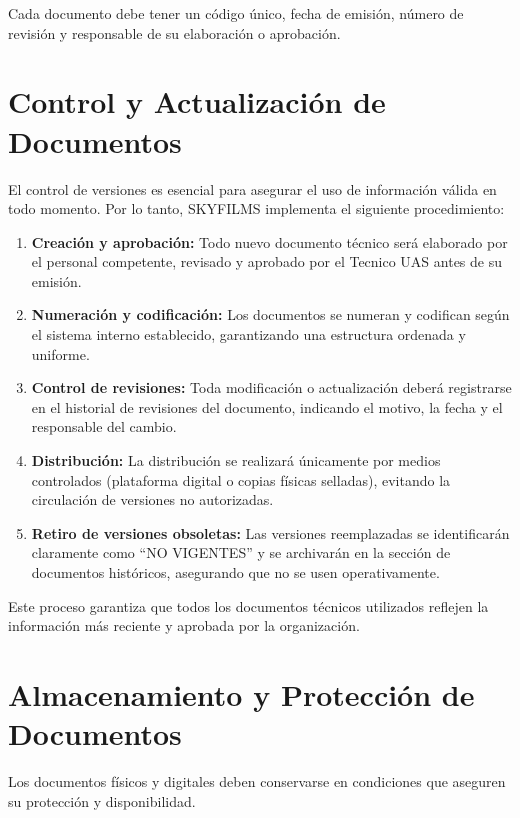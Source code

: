 Cada documento debe tener un código único, fecha de emisión, número de revisión y responsable de su elaboración o aprobación.

\section{Control y Actualización de Documentos}
El control de versiones es esencial para asegurar el uso de información válida en todo momento. Por lo tanto, SKYFILMS implementa el siguiente procedimiento:

\begin{enumerate}
    \item \textbf{Creación y aprobación:} Todo nuevo documento técnico será elaborado por el personal competente, revisado y aprobado por el Tecnico UAS antes de su emisión.

    \item \textbf{Numeración y codificación:} Los documentos se numeran y codifican según el sistema interno establecido, garantizando una estructura ordenada y uniforme.

    \item \textbf{Control de revisiones:} Toda modificación o actualización deberá registrarse en el historial de revisiones del documento, indicando el motivo, la fecha y el responsable del cambio.

    \item \textbf{Distribución:} La distribución se realizará únicamente por medios controlados (plataforma digital o copias físicas selladas), evitando la circulación de versiones no autorizadas.

    \item \textbf{Retiro de versiones obsoletas:} Las versiones reemplazadas se identificarán claramente como “NO VIGENTES” y se archivarán en la sección de documentos históricos, asegurando que no se usen operativamente.
\end{enumerate}

Este proceso garantiza que todos los documentos técnicos utilizados reflejen la información más reciente y aprobada por la organización.

\section{Almacenamiento y Protección de Documentos}
Los documentos físicos y digitales deben conservarse en condiciones que aseguren su protección y disponibilidad.

